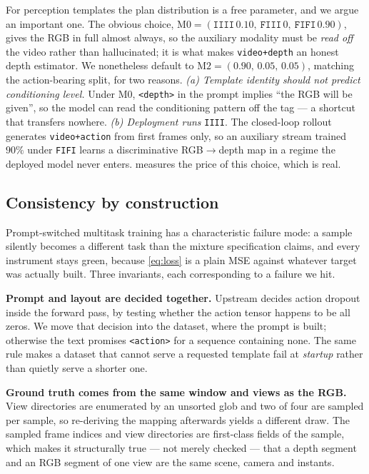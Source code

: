 \documentclass{article} %
\newcommand{\tmpl}[1]{\texttt{#1}}
\newcommand{\ptag}[1]{\texttt{<#1>}}   %
\begin{document}
For perception templates the plan distribution is a free parameter, and we argue an important one.
The obvious choice, $\mathrm{M0} = (\texttt{IIII}\,0.10,\ \texttt{FIII}\,0,\ \texttt{FIFI}\,0.90)$,
gives the RGB in full almost always, so the auxiliary modality must be \emph{read off} the video
rather than hallucinated; it is what makes \tmpl{video+depth} an honest depth estimator. We
nonetheless default to $\mathrm{M2} = (0.90,\,0.05,\,0.05)$, matching the action-bearing split, for
two reasons. \emph{(a) Template identity should not predict conditioning level.} Under M0,
\ptag{depth} in the prompt implies ``the RGB will be given'', so the model can read the
conditioning pattern off the tag --- a shortcut that transfers nowhere. \emph{(b) Deployment runs}
\texttt{IIII}. The closed-loop rollout generates \tmpl{video+action} from first frames only, so an
auxiliary stream trained $90\%$ under \texttt{FIFI} learns a discriminative RGB$\to$depth map in a
regime the deployed model never enters.  measures the price of this choice,
which is real.

\subsection{Consistency by construction}
\label{sec:invariants}

Prompt-switched multitask training has a characteristic failure mode: a sample silently becomes a
different task than the mixture specification claims, and every instrument stays green, because
\eqref{eq:loss} is a plain MSE against whatever target was actually built. Three invariants, each
corresponding to a failure we hit.

\textbf{Prompt and layout are decided together.} Upstream decides action dropout inside the forward
pass, by testing whether the action tensor happens to be all zeros. We move that decision into the
dataset, where the prompt is built; otherwise the text promises \ptag{action} for a sequence
containing none. The same rule makes a dataset that cannot serve a requested template fail at
\emph{startup} rather than quietly serve a shorter one.

\textbf{Ground truth comes from the same window and views as the RGB.} View directories are
enumerated by an unsorted glob and two of four are sampled per sample, so re-deriving the mapping
afterwards yields a different draw. The sampled frame indices and view directories are first-class
fields of the sample, which makes it structurally true --- not merely checked --- that a depth
segment and an RGB segment of one view are the same scene, camera and instants.
\end{document}
